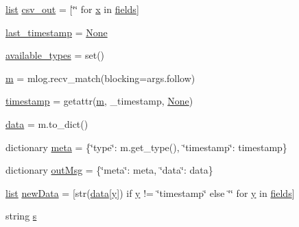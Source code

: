\begin{DoxyCompactItemize}
\item 
\mbox{\hyperlink{structlist}{list}} \mbox{\hyperlink{namespacepymavlink_1_1tools_1_1mavlogdump_afe3b16924e9b873155d166fd727643e3}{csv\+\_\+out}} = \mbox{[}\char`\"{}\char`\"{} for \mbox{\hyperlink{plottingTest_8cpp_aa0155849a1850c1edcfe7bce685b08f1}{x}} in \mbox{\hyperlink{namespacepymavlink_1_1tools_1_1mavlogdump_a8a7ca8e476c5e470f5fff33b76b6abb0}{fields}}\mbox{]}
\item 
\mbox{\hyperlink{namespacepymavlink_1_1tools_1_1mavlogdump_a53ff4c2645da546179bd721de494e04a}{last\+\_\+timestamp}} = \mbox{\hyperlink{namespacepymavlink_1_1tools_1_1mavlogdump_a4f907ac5c5d06d13d8020f0969229a7e}{None}}
\item 
\mbox{\hyperlink{namespacepymavlink_1_1tools_1_1mavlogdump_a1e9da64218374e9236ed3cd6fbe3046a}{available\+\_\+types}} = set()
\item 
\mbox{\hyperlink{namespacepymavlink_1_1tools_1_1mavlogdump_ad6f8303b7b10c5216189a5b97e662b84}{m}} = mlog.\+recv\+\_\+match(blocking=args.\+follow)
\item 
\mbox{\hyperlink{namespacepymavlink_1_1tools_1_1mavlogdump_a48f60cea754ecb290fd64f00e0ed6840}{timestamp}} = getattr(\mbox{\hyperlink{namespacepymavlink_1_1tools_1_1mavlogdump_ad6f8303b7b10c5216189a5b97e662b84}{m}}, \textquotesingle{}\+\_\+timestamp\textquotesingle{}, \mbox{\hyperlink{namespacepymavlink_1_1tools_1_1mavlogdump_a4f907ac5c5d06d13d8020f0969229a7e}{None}})
\item 
\mbox{\hyperlink{namespacepymavlink_1_1tools_1_1mavlogdump_a85115ce0f3935727ee1721b7e8b8befe}{data}} = m.\+to\+\_\+dict()
\item 
dictionary \mbox{\hyperlink{namespacepymavlink_1_1tools_1_1mavlogdump_ad3723a3a312a13fed34c390355d09a3d}{meta}} = \{\char`\"{}type\char`\"{}\+: m.\+get\+\_\+type(), \char`\"{}timestamp\char`\"{}\+: timestamp\}
\item 
dictionary \mbox{\hyperlink{namespacepymavlink_1_1tools_1_1mavlogdump_a4702d8d4cc541614f5245654255814b7}{out\+Msg}} = \{\char`\"{}meta\char`\"{}\+: meta, \char`\"{}data\char`\"{}\+: data\}
\item 
\mbox{\hyperlink{structlist}{list}} \mbox{\hyperlink{namespacepymavlink_1_1tools_1_1mavlogdump_a1479908be3a298d998f53d46ec01ccb2}{new\+Data}} = \mbox{[}str(\mbox{\hyperlink{structdata}{data}}\mbox{[}\mbox{\hyperlink{plottingTest_8cpp_a64d0474b77956c0e971da1b6cb1ddacd}{y}}\mbox{]}) if \mbox{\hyperlink{plottingTest_8cpp_a64d0474b77956c0e971da1b6cb1ddacd}{y}} != \char`\"{}timestamp\char`\"{} else \char`\"{}\char`\"{} for \mbox{\hyperlink{plottingTest_8cpp_a64d0474b77956c0e971da1b6cb1ddacd}{y}} in \mbox{\hyperlink{namespacepymavlink_1_1tools_1_1mavlogdump_a8a7ca8e476c5e470f5fff33b76b6abb0}{fields}}\mbox{]}
\item 
string \mbox{\hyperlink{namespacepymavlink_1_1tools_1_1mavlogdump_a627870b1439e6436d74da8547ae782a6}{s}}
\end{DoxyCompactItemize}


